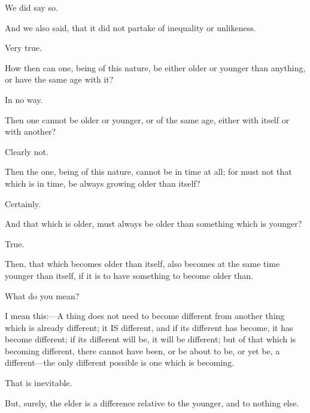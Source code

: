 \documentclass[11pt,letter]{article}
\begin{document}
\par  We did say so.

\par  And we also said, that it did not partake of inequality or unlikeness.

\par  Very true.

\par  How then can one, being of this nature, be either older or younger than anything, or have the same age with it?

\par  In no way.

\par  Then one cannot be older or younger, or of the same age, either with itself or with another?

\par  Clearly not.

\par  Then the one, being of this nature, cannot be in time at all; for must not that which is in time, be always growing older than itself?

\par  Certainly.

\par  And that which is older, must always be older than something which is younger?

\par  True.

\par  Then, that which becomes older than itself, also becomes at the same time younger than itself, if it is to have something to become older than.

\par  What do you mean?

\par  I mean this:—A thing does not need to become different from another thing which is already different; it IS different, and if its different has become, it has become different; if its different will be, it will be different; but of that which is becoming different, there cannot have been, or be about to be, or yet be, a different—the only different possible is one which is becoming.

\par  That is inevitable.

\par  But, surely, the elder is a difference relative to the younger, and to nothing else.
\end{document}
